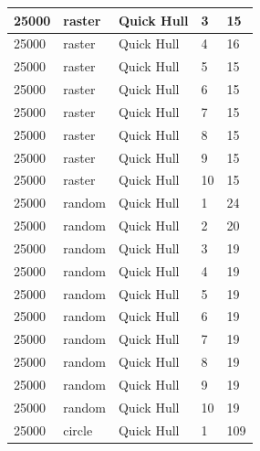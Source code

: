 \documentclass[12pt]{article}
\begin{document}
\begin{longtable}{|l|l|l|l|l|}
25000        & raster            & Quick Hull & 3          & 15                            \\ \hline
25000        & raster            & Quick Hull & 4          & 16                            \\ \hline
25000        & raster            & Quick Hull & 5          & 15                            \\ \hline
25000        & raster            & Quick Hull & 6          & 15                            \\ \hline
25000        & raster            & Quick Hull & 7          & 15                            \\ \hline
25000        & raster            & Quick Hull & 8          & 15                            \\ \hline
25000        & raster            & Quick Hull & 9          & 15                            \\ \hline
25000        & raster            & Quick Hull & 10         & 15                            \\ \hline
25000        & random            & Quick Hull & 1          & 24                            \\ \hline
25000        & random            & Quick Hull & 2          & 20                            \\ \hline
25000        & random            & Quick Hull & 3          & 19                            \\ \hline
25000        & random            & Quick Hull & 4          & 19                            \\ \hline
25000        & random            & Quick Hull & 5          & 19                            \\ \hline
25000        & random            & Quick Hull & 6          & 19                            \\ \hline
25000        & random            & Quick Hull & 7          & 19                            \\ \hline
25000        & random            & Quick Hull & 8          & 19                            \\ \hline
25000        & random            & Quick Hull & 9          & 19                            \\ \hline
25000        & random            & Quick Hull & 10         & 19                            \\ \hline
25000        & circle            & Quick Hull & 1          & 109                           \\ \hline

\end{longtable}
\end{document}
